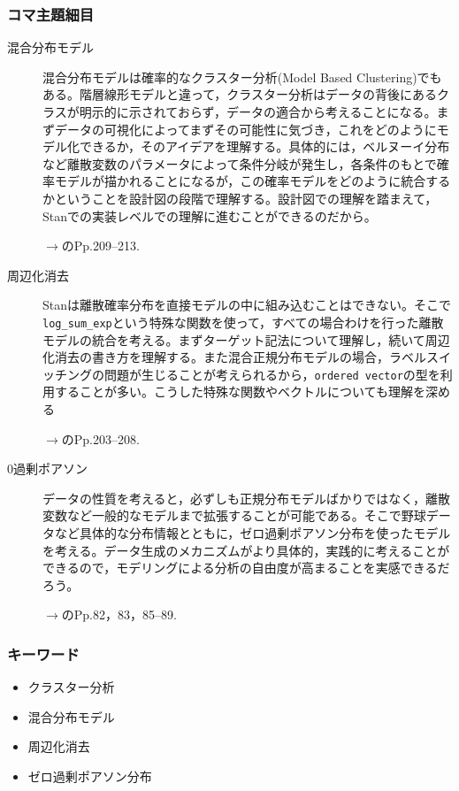 \subsubsection{コマ主題細目}
\begin{description}
	\item[混合分布モデル] 混合分布モデルは確率的なクラスター分析(Model Based Clustering)でもある。階層線形モデルと違って，クラスター分析はデータの背後にあるクラスが明示的に示されておらず，データの適合から考えることになる。まずデータの可視化によってまずその可能性に気づき，これをどのようにモデル化できるか，そのアイデアを理解する。具体的には，ベルヌーイ分布など離散変数のパラメータによって条件分岐が発生し，各条件のもとで確率モデルが描かれることになるが，この確率モデルをどのように統合するかということを設計図の段階で理解する。設計図での理解を踏まえて，Stanでの実装レベルでの理解に進むことができるのだから。
	      \begin{flushright}
		      $\to$\citet{Matsuura201610}のPp.209--213.
	      \end{flushright}

	\item[周辺化消去] Stanは離散確率分布を直接モデルの中に組み込むことはできない。そこで\verb|log_sum_exp|という特殊な関数を使って，すべての場合わけを行った離散モデルの統合を考える。まずターゲット記法について理解し，続いて周辺化消去の書き方を理解する。また混合正規分布モデルの場合，ラベルスイッチングの問題が生じることが考えられるから，\verb|ordered vector|の型を利用することが多い。こうした特殊な関数やベクトルについても理解を深める
	      \begin{flushright}
		      $\to$\citet{Matsuura201610}のPp.203--208.
	      \end{flushright}
	\item[0過剰ポアソン] データの性質を考えると，必ずしも正規分布モデルばかりではなく，離散変数など一般的なモデルまで拡張することが可能である。そこで野球データなど具体的な分布情報とともに，ゼロ過剰ポアソン分布を使ったモデルを考える。データ生成のメカニズムがより具体的，実践的に考えることができるので，モデリングによる分析の自由度が高まることを実感できるだろう。
	      \begin{flushright}
		      $\to$\citet{Matsuura201610}のPp.82，83，85--89.
	      \end{flushright}
\end{description}
\subsubsection{キーワード}
\begin{itemize}
	\item クラスター分析
	\item 混合分布モデル
	\item 周辺化消去
	\item ゼロ過剰ポアソン分布
\end{itemize}
